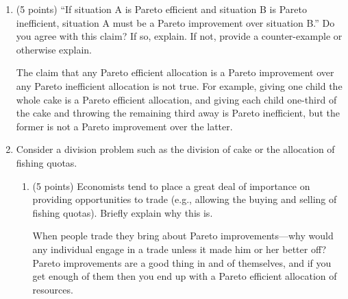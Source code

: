 \documentclass[twoside]{article}
\begin{document}
\begin{enumerate}
\begin{enumerate}
    \end{enumerate}











\item \begin{EXAM} (5 points) ``If situation A is Pareto efficient and situation B is Pareto inefficient, situation A must be a Pareto improvement over situation B.'' Do you agree with this claim? If so, explain. If not, provide a counter-example or otherwise explain. \end{EXAM}

\begin{KEY}
The claim that any Pareto efficient allocation is a Pareto improvement over any Pareto inefficient allocation is not true. For example, giving one child the whole cake is a Pareto efficient allocation, and giving each child one-third of the cake and throwing the remaining third away is Pareto inefficient, but the former is not a Pareto improvement over the latter.
\end{KEY}













\item Consider a division problem such as the division of cake or the allocation of fishing quotas.

    \begin{enumerate}

    \item \begin{EXAM} (5 points) Economists tend to place a great deal of importance on providing opportunities to trade (e.g., allowing the buying and selling of fishing quotas). Briefly explain why this is. \end{EXAM}

\begin{KEY} When people trade they bring about Pareto improvements---why would any individual engage in a trade unless it made him or her better off? Pareto improvements are a good thing in and of themselves, and if you get enough of them then you end up with a Pareto efficient allocation of resources.
\end{KEY}



\end{enumerate}
\end{enumerate}
\end{document}
